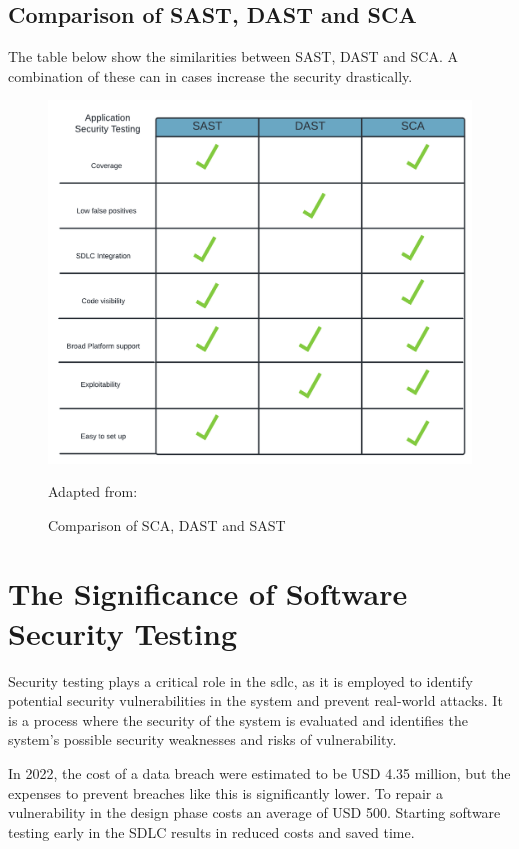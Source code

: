 \subsection{Comparison of SAST, DAST and SCA}
The table below show the similarities between SAST, DAST and SCA. A combination of these can in cases increase the security drastically. 
\begin{figure}[H]
    \centering
    \includegraphics[width=1\columnwidth]{Images/SCA vs DAST vs SAST.png}
    \caption{Comparison of SCA, DAST and SAST}Adapted from: \cite{Comparison}
    \label{fig:Comparison of SCA, DAST and SASt}
\end{figure}



\newpage
\section{The Significance of Software Security Testing}
Security testing plays a critical role in the \acrlong{sdlc}, as it is employed to identify potential security vulnerabilities in the system and prevent real-world attacks. It is a process where the security of the system is evaluated and identifies the system's possible security weaknesses and risks of vulnerability.\cite{whysectest}

In 2022, the cost of a data breach were estimated to be USD 4.35 million\cite{databreach}, but the expenses to prevent breaches like this is significantly lower. To repair a vulnerability in the design phase costs an average of USD 500\cite{fixvulnerability}. Starting software testing early in the SDLC results in reduced costs and saved time. 

